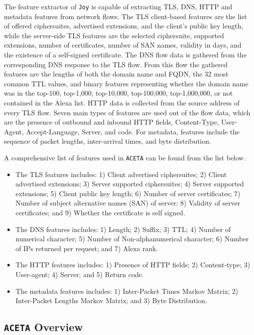 The feature extractor of \texttt{Joy} is capable of extracting TLS, DNS, HTTP and metadata features from network flows. The TLS client-based features are the list of offered ciphersuites, advertised extensions, and the client's public key length, while the server-side TLS features are the selected ciphersuite, supported extensions, number of certificates, number of SAN names, validity in days, and the existence of a self-signed certificate. The DNS flow data is gathered from the corresponding DNS response to the TLS flow. From this flow the gathered features are the lengths of both the domain name and FQDN, the 32 most common TTL values, and binary features representing whether the domain name was in the top-100, top-1,000, top-10,000, top-100,000, top-1,000,000, or not contained in the Alexa list. HTTP data is collected from the source address of every TLS flow. Seven main types of features are used out of the flow data, which are the presence of outbound and inbound HTTP fields, Content-Type, User-Agent, Accept-Language, Server, and code. For metadata, features include the sequence of packet lengths, inter-arrival times, and byte distribution. 

A comprehensive list of features used in \texttt{ACETA} can be found from the list below.

\begin{itemize}
	\item
	The TLS features includes:
	1) Client advertised ciphersuites;
	2) Client advertised extensions;
	3) Server supported ciphersuites;
	4) Server supported extensions;
	5) Client public key length;
	6) Number of server certificates;
	7) Number of subject alternative names (SAN) of server;
	8) Validity of server certificates; and
	9) Whether the certificate is self signed.
	\item
	The DNS features includes: 
	1) Length;
	2) Suffix;
	3) TTL;
	4) Number of numerical character;
	5) Number of Non-alphanumerical character;
	6) Number of IPs returned per request; and
	7) Alexa rank.
	\item
	The HTTP features includes:
	1) Presence of HTTP fields;
	2) Content-type;
	3) User-agent;
	4) Server; and
	5) Return code.
	
	\item
	The metadata features includes: 
	1) Inter-Packet Times Markov Matrix;
	2) Inter-Packet Lengths Markov Matrix; and
	3) Byte Distribution.
\end{itemize}

\subsection{\texttt{ACETA} Overview}

